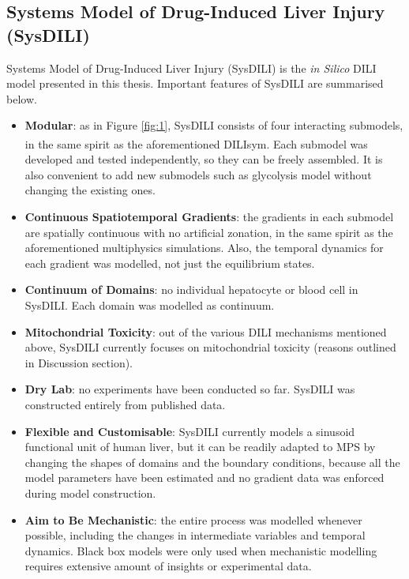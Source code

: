 \documentclass[12pt]{article}
\begin{document}
\subsection{Systems Model of Drug-Induced Liver Injury (SysDILI)}
Systems Model of Drug-Induced Liver Injury (SysDILI) is the \textit{in Silico} DILI model presented in this thesis. Important features of SysDILI are summarised below.
\begin{itemize}
    \item \textbf{Modular}: as in Figure \ref{fig:1}, SysDILI consists of four interacting submodels, in the same spirit as the aforementioned DILIsym\textsuperscript{\textregistered}. Each submodel was developed and tested independently, so they can be freely assembled. It is also convenient to add new submodels such as glycolysis model without changing the existing ones.
    \item \textbf{Continuous Spatiotemporal Gradients}: the gradients in each submodel are spatially continuous with no artificial zonation, in the same spirit as the aforementioned multiphysics simulations. Also, the temporal dynamics for each gradient was modelled, not just the equilibrium states.
     \item \textbf{Continuum of Domains}: no individual hepatocyte or blood cell in SysDILI. Each domain was modelled as continuum.
    \item \textbf{Mitochondrial Toxicity}: out of the various DILI mechanisms mentioned above, SysDILI currently focuses on mitochondrial toxicity (reasons outlined in Discussion section).
    \item \textbf{Dry Lab}: no experiments have been conducted so far. SysDILI was constructed entirely from published data.
    
    \item \textbf{Flexible and Customisable}: SysDILI currently models a sinusoid functional unit of human liver, but it can be readily adapted to MPS by changing the shapes of domains and the boundary conditions, because all the model parameters have been estimated and no gradient data was enforced during model construction.
    \item \textbf{Aim to Be Mechanistic}: the entire process was modelled whenever possible, including the changes in intermediate variables and temporal dynamics. Black box models were only used when mechanistic modelling requires extensive amount of insights or experimental data.
    
\end{itemize}
\end{document}
